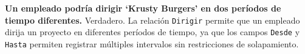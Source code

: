 \textbf{Un empleado podría dirigir ‘Krusty Burgers’ en dos períodos de tiempo diferentes.}\vspace{.3cm}
Verdadero. La relación \texttt{Dirigir} permite que un empleado dirija un proyecto en diferentes períodos de tiempo, ya que los campos \texttt{Desde} y \texttt{Hasta} permiten registrar múltiples intervalos sin restricciones de solapamiento.
